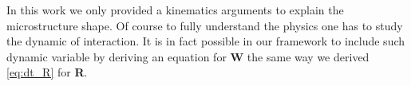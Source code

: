In this work we only provided a kinematics   arguments to explain the microstructure shape. 
Of course to fully understand the physics one has to study the dynamic of interaction. 
It is in fact possible in our framework to include such dynamic variable by deriving an equation for \textbf{W} the same way we derived \ref{eq:dt_R} for \textbf{R}.
